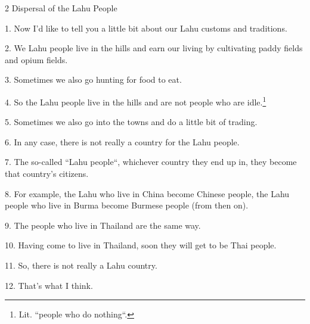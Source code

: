 
2 Dispersal of the Lahu People

1. Now I'd like to tell you a little bit about our Lahu customs and traditions.

2. We Lahu people live in the hills and earn our living by cultivating paddy fields
and opium fields.

3. Sometimes we also go hunting for food to eat.

4. So the Lahu people live in the hills and are not people who are idle.\footnote{Lit. ``people who do nothing``.}

5. Sometimes we also go into the towns and do a little bit of trading.

6. In any case, there is not really a country for the Lahu people.

7. The so-called ``Lahu people``, whichever country they end up
in, they become that country's citizens.

8. For example, the Lahu who live in China become Chinese people, the Lahu people
who live in Burma become Burmese people (from then on).

9. The people who live in Thailand are the same way.

10. Having come to live in Thailand, soon they will get to be Thai people.

11. So, there is not really a Lahu country.

12. That's what I think.

